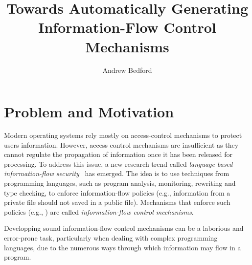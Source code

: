 \documentclass[sigplan,10pt]{acmart}\settopmatter{printfolios=true,printccs=false,printacmref=false}
\begin{document}
\title[ott-ifc]{Towards Automatically Generating Information-Flow Control Mechanisms}


\author{Andrew Bedford}



\maketitle

\section{Problem and Motivation}
Modern operating systems rely mostly on access-control mechanisms to protect users information. However, access control mechanisms are insufficient as they cannot regulate the propagation of information once it has been released for processing. To address this issue, a new research trend called \emph{language-based information-flow security}~\cite{DBLP:journals/jsac/SabelfeldM03} has emerged. The idea is to use techniques from programming languages, such as program analysis, monitoring, rewriting and type checking, to enforce information-flow policies (e.g., information from a private file should not saved in a public file). Mechanisms that enforce such policies (e.g., \cite{DBLP:journals/jcs/VolpanoIS96, DBLP:conf/csfw/ChudnovN10, DBLP:conf/csfw/AskarovCM15, DBLP:journals/compsec/BedfordCDKT17}) are called \emph{information-flow control mechanisms}. 

Developping sound information-flow control mechanisms can be a laborious and error-prone task, particularly when dealing with complex programming languages, due to the numerous ways through which information may flow in a program.

\end{document}
